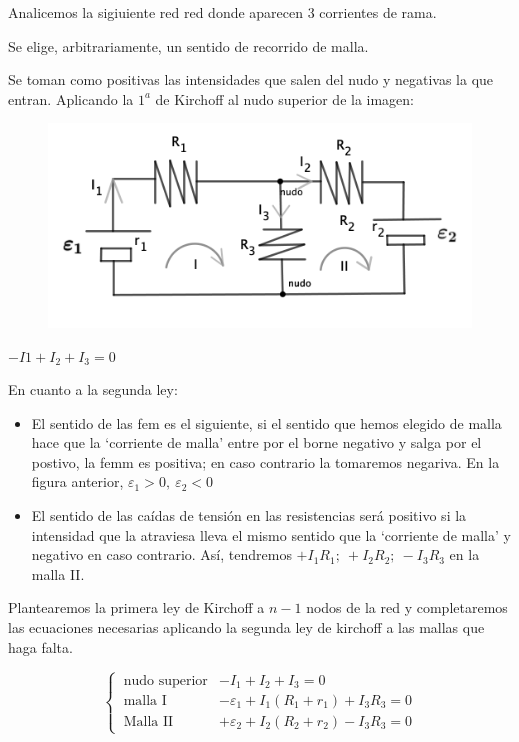 Analicemos la sigiuiente red red donde aparecen 3 corrientes de rama.

\begin{multicols}{2}
Se elige, arbitrariamente,  un sentido de recorrido de malla.

Se toman como positivas las intensidades que salen del nudo y negativas la que entran. Aplicando la $1^a$ de Kirchoff al nudo superior de la imagen:
	\begin{figure}[H]
	\centering
	\includegraphics[width=.55\textwidth]{imagenes/imagenes25/T25IM08.png}
\end{figure}
\end{multicols}
$-I1+I_2+I_3=0$

En cuanto a la segunda ley:

\begin{itemize}
\item El sentido de las fem es el siguiente, si el sentido que hemos elegido de malla hace que la `corriente de malla' entre por el borne negativo y salga por el postivo, la femm es positiva; en caso contrario la tomaremos negariva. En la figura anterior, $\varepsilon_1>0,\ \varepsilon_2<0$

\item El sentido de las caídas de tensión en las resistencias será positivo si la intensidad que la atraviesa lleva el mismo sentido que la `corriente de malla' y negativo en caso contrario. Así, tendremos $+I_1R_1; \ +I_2 R_2; \ -I_3R_3$ en la malla II. 
\end{itemize}

\vspace{5mm} %
\begin{miparrafodestacado}
	Plantearemos la primera ley de Kirchoff a $n-1$ nodos de la red y completaremos las ecuaciones necesarias aplicando la segunda ley de kirchoff a las mallas que haga falta.
\end{miparrafodestacado}

$$ \begin{cases}
 \ \text{nudo superior} & -I_1+I_2+I_3=0 \\
 \ \text{malla I} & -\varepsilon_1+I_1(R_1+r_1)+I_3R_3=0 \\
 \ \text{Malla II} & +\varepsilon_2+I_2(R_2+r_2)-I_3R_3=0
 \end{cases}$$
 
